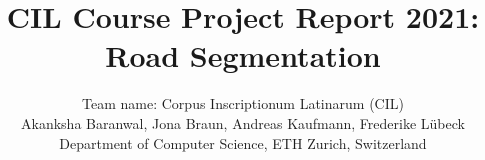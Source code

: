 \documentclass[10pt,conference,compsocconf]{IEEEtran}
\begin{document}
\title{CIL Course Project Report 2021: Road Segmentation}

\author{
  Team name: Corpus Inscriptionum Latinarum (CIL) \\
  Akanksha Baranwal, Jona Braun, Andreas Kaufmann, Frederike Lübeck \\
  Department of Computer Science, ETH Zurich, Switzerland
}

\maketitle
















\printglossary[type=\acronymtype]
\end{document}
